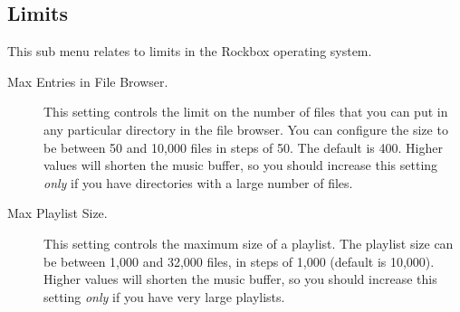 \subsection{Limits}
This sub menu relates to limits in the Rockbox operating system.
  \begin{description}
    \item [Max Entries in File Browser.] This setting controls the limit on
    the number of files that you can put in any particular directory in the
    file browser. You can configure the size to be between 50 and
    10,000 files in steps of 50. The default is 400. Higher values will shorten
    the music buffer, so you should increase this setting \emph{only} if you have
    directories with a large number of files.

    \item [Max Playlist Size.] This setting controls the maximum size of
    a playlist. The playlist size can be between 1,000 and 32,000 files,
    in steps of 1,000 (default is 10,000). Higher values will shorten the
    music buffer, so you should increase this setting \emph{only} if you
    have very large playlists.
  \end{description}


